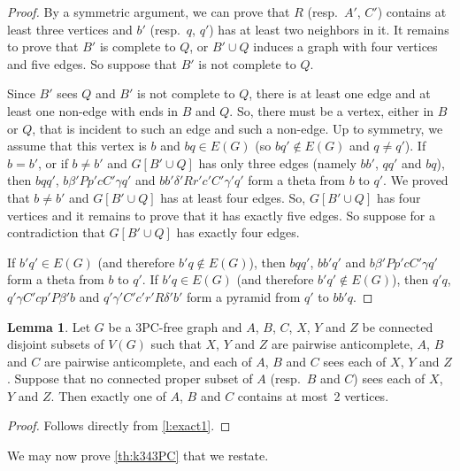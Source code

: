 \documentclass[11pt]{article}
\theoremstyle{definition}
\newtheorem{lemma}[theorem]{Lemma}
\theoremstyle{definition}
\begin{document}
\begin{proof}
  
  By a symmetric argument, we can prove that $R$ (resp.\ $A'$, $C'$)
  contains at least three vertices and $b'$ (resp.\ $q$, $q'$) has at
  least two neighbors in it.  It remains to prove that $B'$ is
  complete to $Q$, or $B'\cup Q$ induces a graph with four vertices
  and five edges.  So suppose that $B'$ is not complete to $Q$.

  
  Since $B'$ sees $Q$ and $B'$ is not complete to $Q$, there is at
  least one edge and at least one non-edge with ends in $B$ and $Q$.
  So, there must be a vertex, either in $B$ or $Q$, that is incident
  to such an edge and such a non-edge. Up to symmetry, we assume that
  this vertex is $b$ and $bq\in E(G)$ (so $bq'\notin E(G)$ and
  $q\neq q'$).  If $b=b'$, or if $b\neq b'$ and $G[B'\cup Q]$ has only
  three edges (namely $bb'$, $qq'$ and $bq$), then $bqq'$,
  $b\beta' P p' c C' \gamma q'$ and
  $b b'\delta' R r' c' C' \gamma' q'$ form a theta from $b$ to $q'$.
  We proved that $b\neq b'$ and $G[B'\cup Q]$ has at least four edges.
  So, $G[B'\cup Q]$ has four vertices and it remains to prove that it
  has exactly five edges.  So suppose for a contradiction that
  $G[B'\cup Q]$ has exactly four edges.

  If $b'q'\in E(G)$ (and therefore $b'q\notin E(G)$), then $bqq'$,
  $bb'q'$ and $b\beta' P p' c C' \gamma q'$ form a theta from $b$ to
  $q'$.  If $b'q\in E(G)$ (and therefore $b'q'\notin E(G)$), then
  $q'q$, $q' \gamma C' c p' P \beta' b$ and
  $q' \gamma' C' c' r' R \delta' b'$ form a pyramid from $q'$ to
  $bb'q$.
\end{proof}


 
\begin{lemma}
  \label{l:exact2}
  Let $G$ be a 3PC-free graph and $A$, $B$, $C$, $X$, $Y$ and $Z$ be
  connected disjoint subsets of $V(G)$ such that $X$, $Y$ and $Z$ are
  pairwise anticomplete, $A$, $B$ and $C$ are pairwise anticomplete,
  and each of $A$, $B$ and $C$ sees each of $X$, $Y$ and $Z$.  Suppose
  that no connected proper subset of $A$ (resp.~$B$ and $C$) sees each
  of $X$, $Y$ and $Z$.  Then exactly one of $A$, $B$ and $C$ contains
  at most~2 vertices.
\end{lemma}

\begin{proof}
  Follows directly from \cref{l:exact1}.
\end{proof}


We may now prove \cref{th:k343PC} that we restate.
\end{document}
